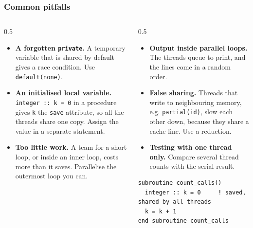 \begin{frame}[fragile]
  \frametitle{Common pitfalls}
  \begin{columns}[T]
    \begin{column}{0.5\textwidth}
      \begin{itemize}
        \item \textbf{A forgotten \texttt{private}.} A temporary variable that is shared by default gives a race condition. Use \texttt{default(none)}.
        \item \textbf{An initialised local variable.} \texttt{integer :: k = 0} in a procedure gives \texttt{k} the \texttt{save} attribute, so all the threads share one copy. Assign the value in a separate statement.
        \item \textbf{Too little work.} A team for a short loop, or inside an inner loop, costs more than it saves. Parallelise the outermost loop you can.
      \end{itemize}
    \end{column}

    \begin{column}{0.5\textwidth}
      \begin{itemize}
        \item \textbf{Output inside parallel loops.} The threads queue to print, and the lines come in a random order.
        \item \textbf{False sharing.} Threads that write to neighbouring memory, e.g. \texttt{partial(id)}, slow each other down, because they share a cache line. Use a reduction.
        \item \textbf{Testing with one thread only.} Compare several thread counts with the serial result.
      \end{itemize}

      \begin{lstlisting}
subroutine count_calls()
  integer :: k = 0     ! saved, shared by all threads
  k = k + 1
end subroutine count_calls
      \end{lstlisting}
    \end{column}
  \end{columns}
\end{frame}


